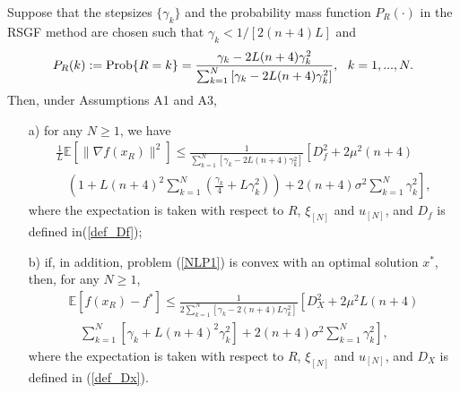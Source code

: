 \documentclass[final]{siamltex}
\newcommand{\beq}{\begin{equation}}
\newcommand{\eeq}{\end{equation}}
\def\eqnok#1{(\ref{#1})}
\def\prob{{\rm Prob}}
\newcommand{\bbe}{\mathbb{E}}
\def\prob{\mathop{\rm Prob}}
\begin{document}
\begin{theorem} \label{zero-noncvx_smth_theorem}
Suppose that the stepsizes $\{\gamma_k\}$ and
the probability mass function $P_R(\cdot)$
in the RSGF method are chosen such that $\gamma_k < 1/[2(n+4)L]$ and
\beq \label{prob_fun2}
P_R(k) := \prob\{R=k\} = \frac{\gamma_k - 2 L(n+4) \gamma_k^2}
{{\sum_{k=1}^N \left[\gamma_k - 2 L(n+4) \gamma_k^2\right]} }, \ \ k= 1,...,N.
\eeq
Then, under Assumptions A1 and A3,
\begin{itemize}
\item [a)] for any $N \ge 1$, we have
\beq \label{zero_noncvx_smth_converg}
\begin{array}{l}
\frac{1}{L} \bbe[\|\nabla f(x_R)\|^2]
\le \frac{1}{\sum_{k=1}^N \left[\gamma_k - 2 L(n+4) \gamma_k^2\right]} \left [ D_f^2 + 2 \mu^2 (n+4) \right.\\
\ \ \ \ \left. \left(1+ L(n+4)^2 \sum_{k=1}^N (\frac{\gamma_k}{4}+L \gamma_k^2)\right)
+ 2(n+4)\sigma^2 \sum_{k=1}^N \gamma_k^2 \right],
\end{array}
\eeq
where the expectation is taken with respect to $R$, $\xi_{[N]}$ and $u_{[N]}$,
and $D_f$ is defined in\eqnok{def_Df};


\item [b)] if, in addition, problem \eqnok{NLP1} is convex with an optimal solution $x^*$, then, for any $N \ge 1$,
\beq \label{zero_cvx_smth_converg}
\begin{array}{l}
\bbe[f(x_R) - f^*] \le \frac{1}{2\sum_{k=1}^N \left[\gamma_k - 2 (n+4)L \gamma_k^2\right]}
\left[ D_X^2+ 2\mu^2 L (n+4) \right.\\
\ \ \ \ \left. \sum_{k=1}^N \left[\gamma_k + L (n+4)^2 \gamma_k^2 \right]+ 2(n+4) \sigma^2 \sum_{k=1}^N \gamma_k^2 \right],
\end{array}
\eeq
where the expectation is taken with respect to $R$, $\xi_{[N]}$ and $u_{[N]}$, and
$D_X$ is defined in \eqnok{def_Dx}.

\end{itemize}

\end{theorem}
\end{document}
